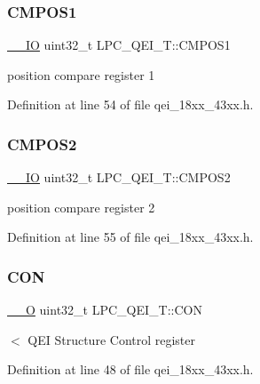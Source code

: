 \subsubsection{\texorpdfstring{C\+M\+P\+O\+S1}{CMPOS1}}
{\footnotesize\ttfamily \hyperlink{core__sc300_8h_aec43007d9998a0a0e01faede4133d6be}{\+\_\+\+\_\+\+IO} uint32\+\_\+t L\+P\+C\+\_\+\+Q\+E\+I\+\_\+\+T\+::\+C\+M\+P\+O\+S1}

position compare register 1 

Definition at line 54 of file qei\+\_\+18xx\+\_\+43xx.\+h.

\mbox{\label{struct_l_p_c___q_e_i___t_aa2f3bddd189d57b8985ffca9ddb70ff2}} 
\subsubsection{\texorpdfstring{C\+M\+P\+O\+S2}{CMPOS2}}
{\footnotesize\ttfamily \hyperlink{core__sc300_8h_aec43007d9998a0a0e01faede4133d6be}{\+\_\+\+\_\+\+IO} uint32\+\_\+t L\+P\+C\+\_\+\+Q\+E\+I\+\_\+\+T\+::\+C\+M\+P\+O\+S2}

position compare register 2 

Definition at line 55 of file qei\+\_\+18xx\+\_\+43xx.\+h.

\mbox{\label{struct_l_p_c___q_e_i___t_af84cacebc1e4ba309cb8c1af4acca96f}} 
\subsubsection{\texorpdfstring{C\+ON}{CON}}
{\footnotesize\ttfamily \hyperlink{core__sc300_8h_a7e25d9380f9ef903923964322e71f2f6}{\+\_\+\+\_\+O} uint32\+\_\+t L\+P\+C\+\_\+\+Q\+E\+I\+\_\+\+T\+::\+C\+ON}

$<$ Q\+EI Structure Control register 

Definition at line 48 of file qei\+\_\+18xx\+\_\+43xx.\+h.

\mbox{\label{struct_l_p_c___q_e_i___t_a72886edbac2779ab5e2823fd0db339f7}} 
